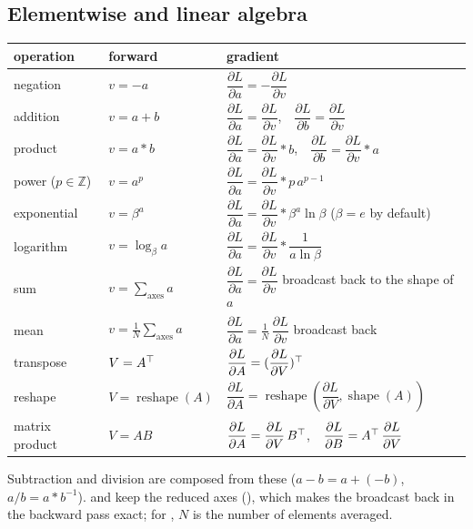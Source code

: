 \subsection{Elementwise and linear algebra}
\begin{center}
\renewcommand{\arraystretch}{2.4}\renewcommand{\dL}[1]{\dfrac{\partial L}{\partial #1}}  %
\begin{tabular}{@{}lll@{}}
\toprule
operation & forward & gradient \\
\midrule
negation       & $v = -a$                  & $\dL{a} = -\dL{v}$ \\
addition       & $v = a + b$               & $\dL{a} = \dL{v}$,\ \ $\dL{b} = \dL{v}$ \\
product        & $v = a \ast b$            & $\dL{a} = \dL{v} \ast b$,\ \ $\dL{b} = \dL{v} \ast a$ \\
power ($p\in\mathbb{Z}$) & $v = a^{p}$     & $\dL{a} = \dL{v} \ast p\, a^{p-1}$ \\
exponential    & $v = \beta^{a}$           & $\dL{a} = \dL{v} \ast \beta^{a} \ln\beta$ \quad ($\beta = e$ by default) \\
logarithm      & $v = \log_\beta a$        & $\dL{a} = \dL{v} \ast \dfrac{1}{a \ln \beta}$ \\
sum            & $v = \sum_{\text{axes}} a$ & $\dL{a} = \dL{v}$ broadcast back to the shape of $a$ \\
mean           & $v = \tfrac{1}{N}\sum_{\text{axes}} a$ & $\dL{a} = \tfrac{1}{N}\, \dL{v}$ broadcast back \\
transpose      & $V = A^{\top}$                 & $\dL{A} = (\dL{V})\T$ \\
reshape        & $V = \operatorname{reshape}(A)$ & $\dL{A} = \operatorname{reshape}(\dL{V}, \operatorname{shape}(A))$ \\
matrix product & $V = AB$                  & $\dL{A} = \dL{V}\, B\T$,\ \ $\dL{B} = A\T\, \dL{V}$ \\
\bottomrule
\end{tabular}
\end{center}
Subtraction and division are composed from these ($a - b = a + (-b)$, $a/b = a \ast b^{-1}$).
 and  keep the reduced axes (), which makes the broadcast back in
the backward pass exact; for , $N$ is the number of elements averaged.

